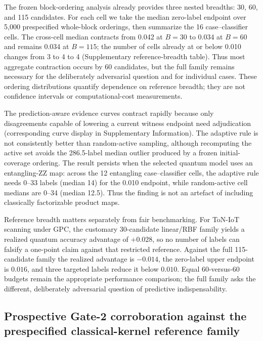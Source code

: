 \documentclass[referee,lineno,pdflatex,sn-nature]{sn-jnl}
\theoremstyle{thmstyleone}%
\theoremstyle{thmstyletwo}%
\theoremstyle{thmstylethree}%
\begin{document}
The frozen block-ordering analysis already provides three nested breadths: 30, 60, and 115 candidates. For each cell we take the median zero-label endpoint over 5,000 prespecified whole-block orderings, then summarize the 16 case--classifier cells. The cross-cell median contracts from 0.042 at $B=30$ to 0.034 at $B=60$ and remains 0.034 at $B=115$; the number of cells already at or below 0.010 changes from 3 to 4 to 4 (Supplementary reference-breadth table). Thus most aggregate contraction occurs by 60 candidates, but the full family remains necessary for the deliberately adversarial question and for individual cases. These ordering distributions quantify dependence on reference breadth; they are not confidence intervals or computational-cost measurements.

The prediction-aware evidence curves contract rapidly because only disagreements capable of lowering a current witness endpoint need adjudication (corresponding curve display in Supplementary Information). The adaptive rule is not consistently better than random-active sampling, although recomputing the active set avoids the 286.5-label median outlier produced by a frozen initial-coverage ordering. The result persists when the selected quantum model uses an entangling-ZZ map: across the 12 entangling case--classifier cells, the adaptive rule needs 0--33 labels (median 14) for the 0.010 endpoint, while random-active cell medians are 0--34 (median 12.5). Thus the finding is not an artefact of including classically factorizable product maps.

Reference breadth matters separately from fair benchmarking. For ToN-IoT scanning under GPC, the customary 30-candidate linear/RBF family yields a realized quantum accuracy advantage of $+0.028$, so no number of labels can falsify a one-point claim against that restricted reference. Against the full 115-candidate family the realized advantage is $-0.014$, the zero-label upper endpoint is $0.016$, and three targeted labels reduce it below $0.010$. Equal 60-versus-60 budgets remain the appropriate performance comparison; the full family asks the different, deliberately adversarial question of predictive indispensability.

\subsection{Prospective Gate-2 corroboration against the prespecified classical-kernel reference family}
\label{sec:res_gate2_prospective}
\end{document}
